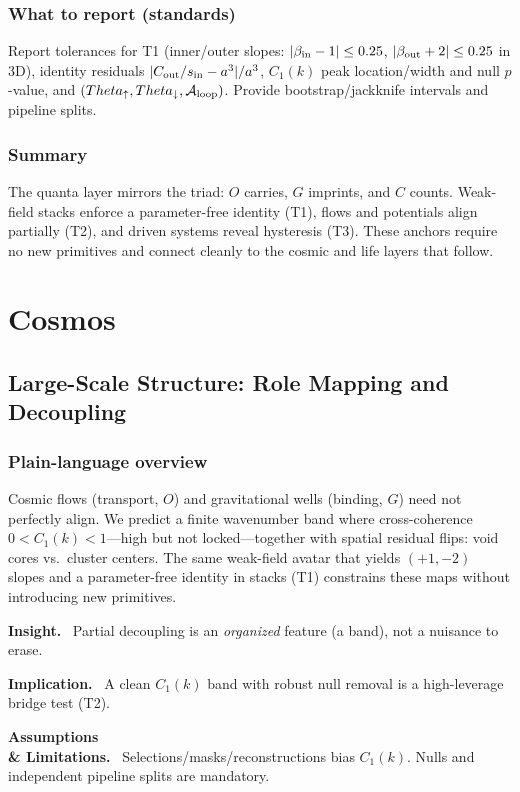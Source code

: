 \documentclass[12pt,a4paper,oneside]{scrreprt}
\def\Theta{Theta}%
\newenvironment{insight}{\par\vspace{0.5em}\noindent\textbf{Insight.}\ }{\par\vspace{0.5em}}
\newenvironment{implication}{\par\vspace{0.5em}\noindent\textbf{Implication.}\ }{\par\vspace{0.5em}}
\newenvironment{limitation}{\par\vspace{0.5em}\noindent\textbf{Assumptions \\ \& Limitations.}\ }{\par\vspace{0.5em}}
\begin{document}
\section{What to report (standards)}\label{sec:quanta-report}
Report tolerances for T1 (inner/outer slopes: $|\beta_{\rm in}-1|\le 0.25$, $|\beta_{\rm out}+2|\le 0.25$ in 3D), identity residuals $|C_{\rm out}/s_{\rm in}-a^3|/a^3$, $C_1(k)$ peak location/width and null $p$-value, and $(\Theta_\uparrow,\Theta_\downarrow,\mathcal A_{\rm loop})$. Provide bootstrap/jackknife intervals and pipeline splits.

\section*{Summary}
The quanta layer mirrors the triad: $O$ carries, $G$ imprints, and $C$ counts. Weak-field stacks enforce a parameter-free identity (T1), flows and potentials align partially (T2), and driven systems reveal hysteresis (T3). These anchors require no new primitives and connect cleanly to the cosmic and life layers that follow.

\part{Cosmos}

\chapter{Large-Scale Structure: Role Mapping and Decoupling}\label{ch:lss-role}

\section*{Plain-language overview}
Cosmic flows (transport, $O$) and gravitational wells (binding, $G$) need not perfectly align. 
We predict a finite wavenumber band where cross-coherence $0<C_1(k)<1$—high but not locked—together with spatial residual flips: void cores vs.\ cluster centers. 
The same weak-field avatar that yields $(+1,-2)$ slopes and a parameter-free identity in stacks (T1) constrains these maps without introducing new primitives.

\begin{insight}
Partial decoupling is an \emph{organized} feature (a band), not a nuisance to erase.
\end{insight}
\begin{implication}
A clean $C_1(k)$ band with robust null removal is a high-leverage bridge test (T2).
\end{implication}
\begin{limitation}
Selections/masks/reconstructions bias $C_1(k)$. Nulls and independent pipeline splits are mandatory.

\end{limitation}
\end{document}
